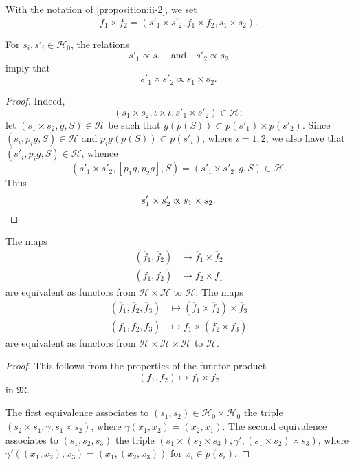 \documentclass[a4paper,fleqn]{article}
\theoremstyle{plain}
\newenvironment{proposition}[1]
  {\renewcommand\theinnerproposition{#1}\innerproposition}
  {\endinnerproposition}
\theoremstyle{definition}
\newcommand{\textand}{\quad\text{and}\quad}
\newcommand{\HH}{\mathcal{H}}
\newcommand{\MM}{\mathfrak{M}}
\newcommand{\subs}{\mathrel{\propto}}
\begin{document}
With the notation of \cref{proposition:ii-2}, we set
\[
  \overline{f}_1\times\overline{f}_2
  = (s'_1\times s'_2, f_1\times f_2, s_1\times s_2).
\]

\begin{proposition}{3}
\label{proposition:ii-3}
  For $s_i,s'_i\in\HH_0$, the relations
  \[
    s'_1\subs s_1
    \textand
    s'_2\subs s_2
  \]
  imply that
  \[
    s'_1\times s'_2
    \subs s_1\times s_2.
  \]
\end{proposition}

\begin{proof}
  Indeed,
  \[
    (s_1\times s_2, \iota\times\iota, s'_1\times s'_2)
    \in\HH;
  \]
  let $(s_1\times s_2,g,S)\in\HH$ be such that $g(p(S))\subset p(s'_1)\times p(s'_2)$.
  Since $(s_i,p_ig,S)\in\HH$ and $p_ig(p(S))\subset p(s'_i)$, where $i=1,2$, we also have that $(s'_i,p_ig,S)\in\HH$, whence
  \[
    (s'_1\times s'_2, [p_1g,p_2g], S)
    = (s'_1\times s'_2,g,S)
    \in\HH.
  \]
  Thus
  \[
    s'_1\times s'_2
    \subs s_1\times s_2.
    \qedhere
  \]
\end{proof}

\begin{proposition}{4}
\label{proposition:ii-4}
  The maps
  \[
    \begin{aligned}
      (\overline{f}_1,\overline{f}_2)
      &\longmapsto \overline{f}_1\times\overline{f}_2
    \\(\overline{f}_1,\overline{f}_2)
      &\longmapsto \overline{f}_2\times\overline{f}_1
    \end{aligned}
  \]
  are equivalent as functors from $\HH\times\HH$ to $\HH$.
  The maps
  \[
    \begin{aligned}
      (\overline{f}_1,\overline{f}_2,\overline{f}_3)
      &\longmapsto (\overline{f}_1\times\overline{f}_2)\times\overline{f}_3
    \\(\overline{f}_1,\overline{f}_2,\overline{f}_3)
      &\longmapsto \overline{f}_1\times(\overline{f}_2\times\overline{f}_3)
    \end{aligned}
  \]
  are equivalent as functors from $\HH\times\HH\times\HH$ to $\HH$.
\end{proposition}

\begin{proof}
  This follows from the properties of the functor-product \cite{3d}
  \[
    (f_1,f_2)
    \longmapsto f_1\times f_2
  \]
  in $\MM$.

  The first equivalence associates to $(s_1,s_2)\in\HH_0\times\HH_0$ the triple $(s_2\times s_1,\gamma,s_1\times s_2)$, where $\gamma(x_1,x_2)=(x_2,x_1)$.
  The second equivalence associates to $(s_1,s_2,s_3)$ the triple $(s_1\times(s_2\times s_3),\gamma',(s_1\times s_2)\times s_3)$, where $\gamma'((x_1,x_2),x_3)=(x_1,(x_2,x_3))$ for $x_i\in p(s_i)$.
\end{proof}
\end{document}
